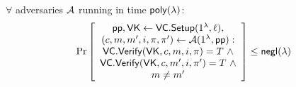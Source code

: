 \begin{definition}
\label{def:vc:position-binding-security}
$\forall$ adversaries $\mathcal{A}$ running in time $\mathsf{poly}(\lambda)$:
\begin{align*}
\Pr \left[ \begin{array}{c}
\mathsf{pp},\mathsf{VK} \leftarrow \mathsf{VC.Setup}(1^\lambda, \ell), \\
(c,m,m',i,\pi,\pi') \leftarrow \mathcal{A}(1^\lambda, \mathsf{pp}): \\
\mathsf{VC.Verify}(\mathsf{VK}, c, m, i, \pi) = T\ \wedge \\
\mathsf{VC.Verify}(\mathsf{VK}, c, m', i, \pi') = T\ \wedge \\
m \ne m'
\end{array} \right] \le \mathsf{negl}(\lambda)
\end{align*}
\end{definition}
